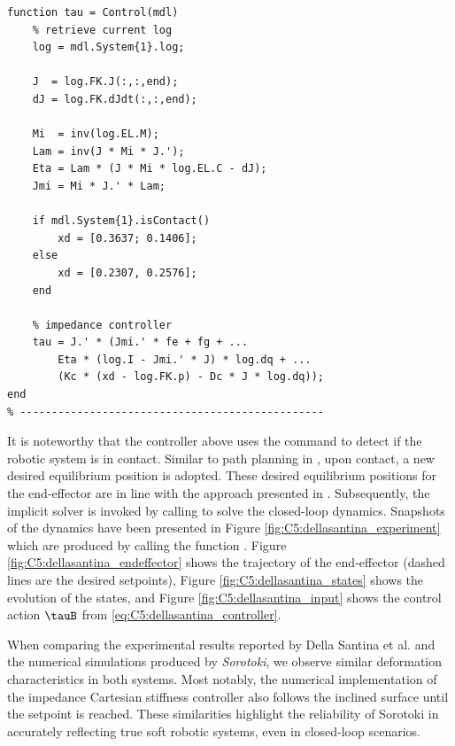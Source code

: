 \begin{lstlisting}[style=matlab] 
% ------------------------------------------------    
function tau = Control(mdl)
    % retrieve current log
    log = mdl.System{1}.log;

    J  = log.FK.J(:,:,end);        
    dJ = log.FK.dJdt(:,:,end); 
    
    Mi  = inv(log.EL.M);
    Lam = inv(J * Mi * J.'); 
    Eta = Lam * (J * Mi * log.EL.C - dJ);
    Jmi = Mi * J.' * Lam;

    if mdl.System{1}.isContact()
        xd = [0.3637; 0.1406];
    else
        xd = [0.2307, 0.2576];
    end

    % impedance controller
    tau = J.' * (Jmi.' * fe + fg + ... 
        Eta * (log.I - Jmi.' * J) * log.dq + ...
        (Kc * (xd - log.FK.p) - Dc * J * log.dq));
end
% ------------------------------------------------
\end{lstlisting}
%
It is noteworthy that the controller above uses the command  to detect if the robotic system is in contact. Similar to path planning in \cite{DellaSantina2020Jan}, upon contact, a new desired equilibrium position is adopted. These desired equilibrium positions for the end-effector are in line with the approach presented in \cite{DellaSantina2019Nov}. Subsequently, the implicit solver is invoked by calling  to solve the closed-loop dynamics. Snapshots of the dynamics have been presented in Figure \ref{fig:C5:dellasantina_experiment} which are produced by calling the function . Figure \ref{fig:C5:dellasantina_endeffector} shows the trajectory of the end-effector (dashed lines are the desired setpoints), Figure \ref{fig:C5:dellasantina_states} shows the evolution of the states, and Figure \ref{fig:C5:dellasantina_input} shows the control action $\tauB$ from \eqref{eq:C5:dellasantina_controller}.

When comparing the experimental results reported by Della Santina et al. \cite{DellaSantina2020Jan} and the numerical simulations produced by \textit{Sorotoki}, we observe similar deformation characteristics in both systems. Most notably, the numerical implementation of the impedance Cartesian stiffness controller also follows the inclined surface until the setpoint is reached. These similarities highlight the reliability of Sorotoki in accurately reflecting true soft robotic systems, even in closed-loop scenarios. 

